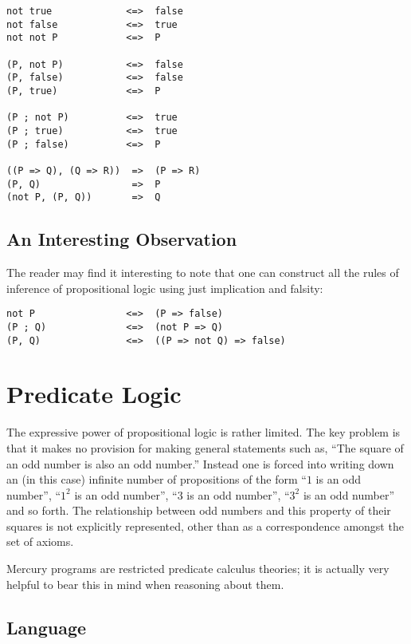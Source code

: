 \begin{itemize}
\begin{verbatim}
not true             <=>  false
not false            <=>  true
not not P            <=>  P

(P, not P)           <=>  false
(P, false)           <=>  false
(P, true)            <=>  P

(P ; not P)          <=>  true
(P ; true)           <=>  true
(P ; false)          <=>  P

((P => Q), (Q => R))  =>  (P => R)
(P, Q)                =>  P
(not P, (P, Q))       =>  Q
\end{verbatim}

\subsection{An Interesting Observation}

The reader may find it interesting to note that one can construct all
the rules of inference of propositional logic using just implication and
falsity:
\begin{verbatim}
not P                <=>  (P => false)
(P ; Q)              <=>  (not P => Q)
(P, Q)               <=>  ((P => not Q) => false)
\end{verbatim}

\section{Predicate Logic}

The expressive power of propositional logic is rather limited.  The key
problem is that it makes no provision for making general statements such
as, ``The square of an odd number is also an odd number.''  Instead one
is forced into writing down an (in this case) infinite number of
propositions of the form ``$1$ is an odd number'', ``$1^2$ is an odd
number'', ``$3$ is an odd number'', ``$3^2$ is an odd number'' and so
forth.  The relationship between odd numbers and this property of their
squares is not explicitly represented, other than as a correspondence
amongst the set of axioms.

Mercury programs are restricted predicate calculus theories; it is
actually very helpful to bear this in mind when reasoning about them.

\subsection{Language}


\end{itemize}
